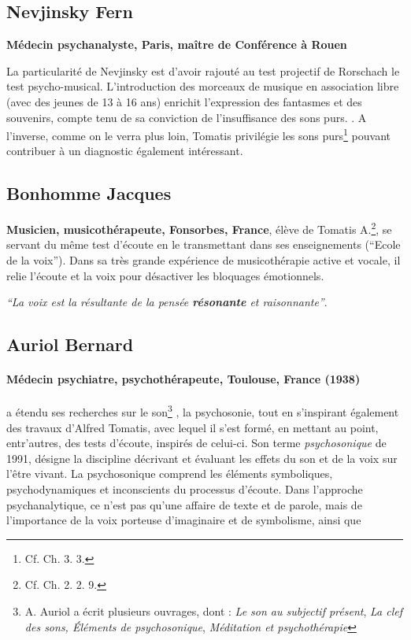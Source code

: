 \subsection{ Nevjinsky Fern}
\textbf{Médecin psychanalyste,
  Paris, maître de Conférence à Rouen}

 La particularité de Nevjinsky est d'avoir rajouté au test projectif de Rorschach le test psycho-musical.
L'introduction des morceaux de musique en association libre (avec
 des jeunes de 13 à 16 ans) enrichit l'expression des fantasmes et des
 souvenirs, compte tenu de sa conviction de l'insuffisance des sons purs.
 \autocite{nevjinsky:adolescence}.
A l'inverse, comme on le verra plus loin, Tomatis
privilégie les sons purs\footnote{Cf. Ch. 3. 3.}  pouvant contribuer à un diagnostic également intéressant.



  \subsection{ Bonhomme Jacques }
  \textbf{Musicien, musicothérapeute,
    Fonsorbes, France}, élève de Tomatis A.\footnote{Cf. Ch. 2. 2. 9. }, se servant du même test
  d'écoute en le transmettant dans ses enseignements (``Ecole de la
  voix''). Dans sa très grande expérience de musicothérapie active et
  vocale, il relie l'écoute et la voix pour désactiver les bloquages
  émotionnels.

  \textit{``La voix est la
      résultante de la pensée \textbf{résonante}  et raisonnante''}. \autocite{bonhomme-key}
      \subsection{Auriol Bernard}

\paragraph{Médecin psychiatre,
   psychothérapeute, Toulouse, France (1938)}
a étendu ses recherches sur le son\footnote{A. Auriol a écrit plusieurs ouvrages, dont : \textsl{Le son au subjectif présent}, \textsl{La clef des sons, Éléments de psychosonique}, \textsl{Méditation et
  psychothérapie}} \autocite{auriol_stress}, la psychosonie,
tout en s'inspirant également des
travaux d'Alfred Tomatis, avec lequel il s'est formé, en mettant au
point, entr'autres, des tests
d'écoute, inspirés de celui-ci.
Son terme \emph{psychosonique} de 1991,
désigne la discipline décrivant et évaluant les effets du
son et de la voix sur l'être vivant.
La psychosonique comprend les éléments
symboliques, psychodynamiques et inconscients du processus
d'écoute.
Dans l'approche  psychanalytique, ce n'est pas qu'une affaire de
texte et de parole, mais de l'importance de la voix porteuse
d'imaginaire et de symbolisme, ainsi que

